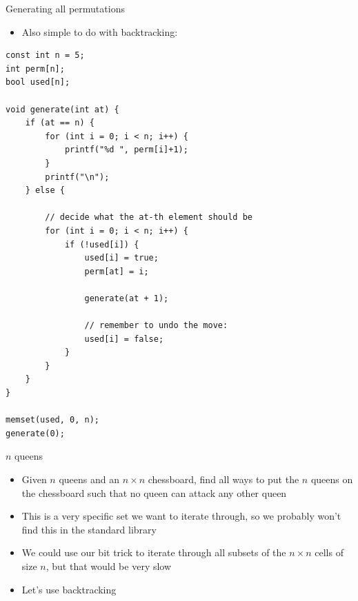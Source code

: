 \documentclass{beamer}
\begin{document}
\begin{frame}{Generating all permutations}
    \begin{itemize}
        \item Also simple to do with backtracking:
    \end{itemize}
    \begin{verbatim}
const int n = 5;
int perm[n];
bool used[n];

void generate(int at) {
    if (at == n) {
        for (int i = 0; i < n; i++) {
            printf("%d ", perm[i]+1);
        }
        printf("\n");
    } else {

        // decide what the at-th element should be
        for (int i = 0; i < n; i++) {
            if (!used[i]) {
                used[i] = true;
                perm[at] = i;

                generate(at + 1);

                // remember to undo the move:
                used[i] = false;
            }
        }
    }
}

memset(used, 0, n);
generate(0);
    \end{verbatim}
\end{frame}

\begin{frame}{$n$ queens}
    \begin{itemize}
        \item Given $n$ queens and an $n\times n$ chessboard, find all ways to
            put the $n$ queens on the chessboard such that no queen can attack
            any other queen

        \vspace{10pt}

        \item This is a very specific set we want to iterate through, so we probably won't find this in the standard library
        \item We could use our bit trick to iterate through all subsets of the $n\times n$ cells of size $n$, but that would be very slow
        \vspace{20pt}
        \item Let's use backtracking
    \end{itemize}
\end{frame}
\end{document}

